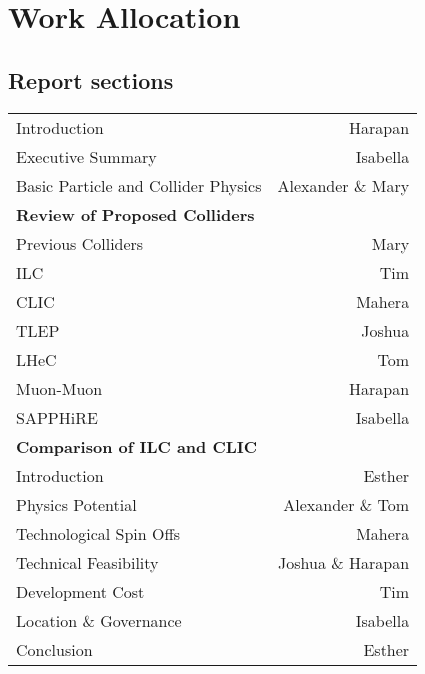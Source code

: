 \section*{Work Allocation}
\subsection*{Report sections}

\begin{tabularx}{\textwidth}{X r}

    Introduction & Harapan \\
    Executive Summary & Isabella \\
    Basic Particle and Collider Physics & Alexander \& Mary \\
    
    \textbf{Review of Proposed Colliders} & \\
        \hspace{1em} Previous Colliders & Mary \\
        \hspace{1em} ILC & Tim \\
        \hspace{1em} CLIC & Mahera \\
        \hspace{1em} TLEP & Joshua \\
        \hspace{1em} LHeC & Tom \\
        \hspace{1em} Muon-Muon & Harapan \\
        \hspace{1em} SAPPHiRE & Isabella \\        
        
    \textbf{Comparison of ILC and CLIC} & \\
        \hspace{1em} Introduction & Esther \\
        \hspace{1em} Physics Potential & Alexander \& Tom \\
        \hspace{1em} Technological Spin Offs & Mahera \\
        \hspace{1em} Technical Feasibility & Joshua \& Harapan \\
        \hspace{1em} Development Cost & Tim \\
        \hspace{1em} Location \& Governance & Isabella \\
        
    Conclusion & Esther \\    
        

\end{tabularx}

